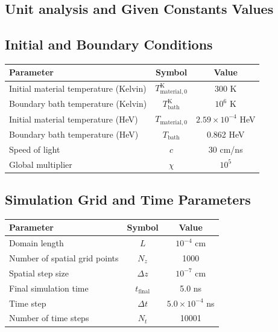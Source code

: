 \documentclass{article}
\begin{document}
\subsection{Unit analysis and Given Constants Values}
\subsection{Initial and Boundary Conditions}
\renewcommand{\arraystretch}{1.5}
\begin{center}
\begin{tabular}{|l|c|c|}
    \hline
    \textbf{Parameter} & \textbf{Symbol} & \textbf{Value} \\
    \hline
    Initial material temperature (Kelvin) & $T_{\mathrm{material,0}}^{\mathrm{K}}$ & 300 K \\
    \hline
    Boundary bath temperature (Kelvin) & $T_{\mathrm{bath}}^{\mathrm{K}}$ & $10^6$ K \\
    \hline
    Initial material temperature (HeV) & $T_{\mathrm{material,0}}$ & $2.59 \times 10^{-4}$ HeV \\
    \hline
    Boundary bath temperature (HeV) & $T_{\mathrm{bath}}$ & 0.862 HeV \\
    \hline
    Speed of light & $c$ & 30 cm/ns \\
    \hline
    Global multiplier & $\chi$ & $10^5$ \\
    \hline
\end{tabular}
\end{center}
\renewcommand{\arraystretch}{1}

\subsection{Simulation Grid and Time Parameters}
\renewcommand{\arraystretch}{1.5}
\begin{center}
\begin{tabular}{|l|c|c|}
    \hline
    \textbf{Parameter} & \textbf{Symbol} & \textbf{Value} \\
    \hline
    Domain length & $L$ & $10^{-4}$ cm \\
    \hline
    Number of spatial grid points & $N_z$ & 1000 \\
    \hline
    Spatial step size & $\Delta z$ & $10^{-7}$ cm \\
    \hline
    Final simulation time & $t_{\mathrm{final}}$ & 5.0 ns \\
    \hline
    Time step & $\Delta t$ & $5.0 \times 10^{-4}$ ns \\
    \hline
    Number of time steps & $N_t$ & 10001 \\
    \hline
\end{tabular}
\end{center}
\renewcommand{\arraystretch}{1}
\end{document}
